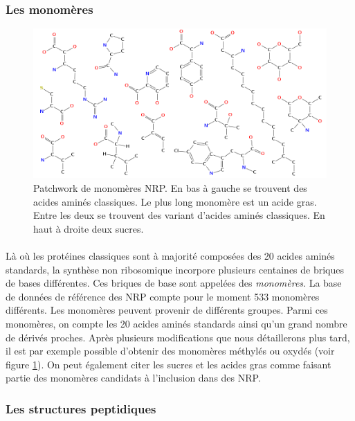\documentclass[12pt,french,twoside]{report}
\begin{document}
\subsubsection{Les monomères}

\begin{figure}[h!]
  \begin{center}
    \includegraphics[width=450px]{Figures/bio/Intro/monos/monos.png}
    \caption{\label{monomers_example}Patchwork de monomères NRP.
    En bas à gauche se trouvent des acides aminés classiques.
    Le plus long monomère est un acide gras.
    Entre les deux se trouvent des variant d'acides aminés classiques.
    En haut à droite deux  sucres.}
  \end{center}
\end{figure}

\paragraph{}Là où les protéines classiques sont à majorité composées des 20 acides aminés standards, la synthèse non ribosomique incorpore plusieurs centaines de briques de bases différentes.
Ces briques de base sont appelées des {\em monomères}.
La base de données de référence des NRP compte pour le moment 533 monomères différents.
Les monomères peuvent provenir de différents groupes.
Parmi ces monomères, on compte les 20 acides aminés standards ainsi qu'un grand nombre de dérivés proches.
Après plusieurs modifications que nous détaillerons plus tard, il est par exemple possible d'obtenir des monomères méthylés ou oxydés (voir figure \ref{monomers_example}).
On peut également citer les sucres et les acides gras comme faisant partie des monomères candidats à l'inclusion dans des NRP.


\subsubsection{Les structures peptidiques}
\end{document}
